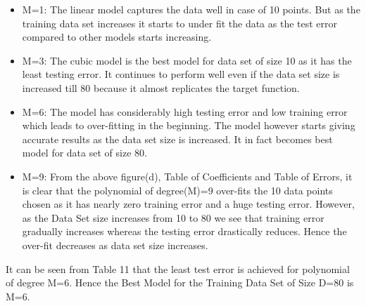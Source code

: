 \documentclass[a4 paper]{article}
\begin{document}
\begin{itemize}
  \item  M=1: The linear model captures the data well in case of 10 points. But as the training data set increases it starts to under fit the data as the test error compared to other models starts increasing.
  \item  M=3: The cubic model is the best model for data set of size 10 as it has the least testing error. It continues to perform well even if the data set size is increased till 80 because it almost replicates the target function. 
  \item  M=6: The model has considerably high testing error and low training error which leads to over-fitting in the beginning. The model however starts giving accurate results as the data set size is increased.
  It in fact becomes best model for data set of size 80.
  \item M=9: From the above figure(d), Table of Coefficients and Table of Errors, it is clear that the polynomial of degree(M)=9 over-fits the 10 data points chosen as it has nearly zero training error and a huge testing error.
  However, as the Data Set size increases from 10 to 80 we see that training error gradually increases whereas the testing error drastically reduces. Hence the over-fit decreases as data set size increases.
\end{itemize}



\newpage
\bigskip
{}  It can be seen from Table 11 that the least test error is achieved for polynomial of degree M=6. Hence the Best Model for the Training Data Set of Size  D=80 is M=6.\\
\end{document}
